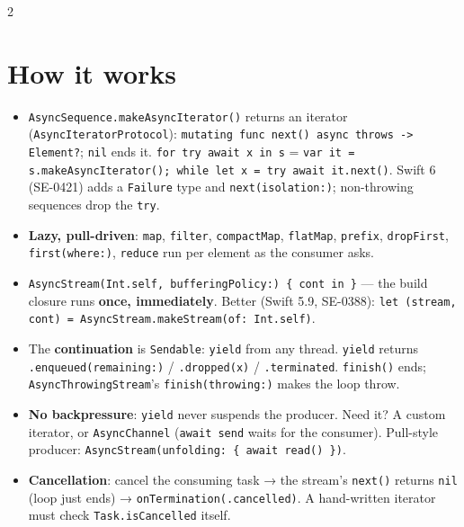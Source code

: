 \documentclass[8pt]{extarticle}
\begin{document}
\begin{multicols}{2}
\raggedright

\section{How it works}
\begin{itemize}
  \item \texttt{AsyncSequence.makeAsyncIterator()} returns an iterator
        (\texttt{AsyncIteratorProtocol}):
        \texttt{mutating func next() async throws -> Element?}; \texttt{nil} ends it.
        \texttt{for try await x in s} = \texttt{var it = s.makeAsyncIterator(); while let x
        = try await it.next()}. Swift 6 (SE-0421) adds a \texttt{Failure} type and
        \texttt{next(isolation:)}; non-throwing sequences drop the \texttt{try}.
  \item \textbf{Lazy, pull-driven}: \texttt{map}, \texttt{filter}, \texttt{compactMap},
        \texttt{flatMap}, \texttt{prefix}, \texttt{dropFirst}, \texttt{first(where:)},
        \texttt{reduce} run per element as the consumer asks.
  \item \texttt{AsyncStream(Int.self, bufferingPolicy:) \{ cont in \}} — the build closure
        runs \textbf{once, immediately}. Better (Swift 5.9, SE-0388):
        \texttt{let (stream, cont) = AsyncStream.makeStream(of: Int.self)}.
  \item The \textbf{continuation} is \texttt{Sendable}: \texttt{yield} from any thread.
        \texttt{yield} returns \texttt{.enqueued(remaining:)} / \texttt{.dropped(x)} /
        \texttt{.terminated}. \texttt{finish()} ends;
        \texttt{AsyncThrowingStream}'s \texttt{finish(throwing:)} makes the loop throw.
  \item \textbf{No backpressure}: \texttt{yield} never suspends the producer. Need it? A
        custom iterator, or \texttt{AsyncChannel} (\texttt{await send} waits for the
        consumer). Pull-style producer: \texttt{AsyncStream(unfolding: \{ await
        read() \})}.
  \item \textbf{Cancellation}: cancel the consuming task → the stream's \texttt{next()}
        returns \texttt{nil} (loop just ends) → \texttt{onTermination(.cancelled)}. A
        hand-written iterator must check \texttt{Task.isCancelled} itself.
\end{itemize}


\end{multicols}
\end{document}
